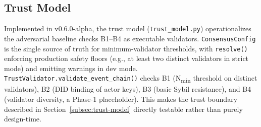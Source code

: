 \subsection{Trust Model}\label{app:trust-model}

Implemented in v0.6.0-alpha, the trust model (\texttt{trust\_model.py}) operationalizes the adversarial baseline checks B1--B4 as executable validators. \texttt{ConsensusConfig} is the single source of truth for minimum-validator thresholds, with \texttt{resolve()} enforcing production safety floors (e.g., at least two distinct validators in strict mode) and emitting warnings in dev mode. \texttt{TrustValidator.validate\_event\_chain()} checks B1 (N\textsubscript{min} threshold on distinct validators), B2 (DID binding of actor keys), B3 (basic Sybil resistance), and B4 (validator diversity, a Phase-1 placeholder). This makes the trust boundary described in Section~\ref{subsec:trust-model} directly testable rather than purely design-time.
